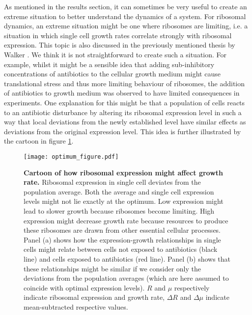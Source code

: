 As mentioned in the results section, it can sometimes be very useful to create an extreme situation to better understand the dynamics of a system.
%
For ribosomal dynamics, an extreme situation might be one where ribosomes are limiting, 
i.e. a situation in which single cell growth rates correlate strongly with ribosomal expression.%
%
This topic is also discussed in the previously mentioned thesis by Walker \cite{Walker2016t}. 
%
We think it is not straightforward to create such a situation.
%
For example, whilst it might be a sensible idea that adding sub-inhibitory concentrations of antibiotics to the cellular growth medium might cause translational stress and 
thus more limiting behaviour of ribosomes,
the addition of antibiotics to growth medium was observed to have limited consequences in experiments.
%
One explanation for this 
might be that a population of cells reacts to an antibiotic disturbance by altering its ribosomal expression level 
in such a way that local deviations from the newly established level have similar effects as deviations from the original expression level.
This idea is further illustrated by the cartoon in 
figure \ref{fig:ribo:optimumCartoon}.
%
\begin{figure}
    \centering
    \texttt{[image: optimum\_figure.pdf]}
    \caption{ 
        \textbf{Cartoon of how ribosomal expression might affect growth rate.}
        Ribosomal expression in single cell deviates from the population average. 
        Both the average and single cell expression levels might not lie exactly at the optimum.
        Low expression might lead to slower growth because ribosomes become limiting.
        High expression might decrease growth rate because resources to produce these ribosomes are drawn from other essential cellular processes.
        Panel (a) shows how the expression-growth relationships in single cells might relate between cells not exposed to antibiotics (black line) and cells exposed to antibiotics (red line). Panel (b) shows that these relationships might be similar if we consider only the deviations from the population averages (which are here assumed to coincide with optimal expression levels). $R$ and $\mu$ respectively indicate ribosomal expression and growth rate, $\Delta{R}$ and $\Delta{\mu}$ indicate mean-subtracted respective values.%
    }
    \label{fig:ribo:optimumCartoon}
\end{figure}
